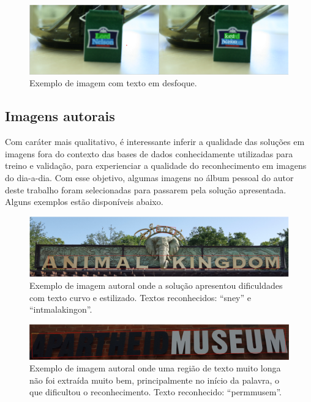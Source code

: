 \begin{figure}
    \centering
    \includegraphics[width=\textwidth]{figs/resultados-icdar13-04.png}
    \caption{Exemplo de imagem com texto em desfoque.}
    \label{fig:results_icdar13_04}
\end{figure}


\subsection{Imagens autorais}\label{sec:results_own_images}
Com caráter mais qualitativo, é interessante inferir a qualidade das soluções em imagens fora do contexto das bases de dados 
conhecidamente utilizadas para treino e validação, para experienciar a qualidade do reconhecimento em imagens do dia-a-dia. 
Com esse objetivo, algumas imagens no álbum pessoal do autor deste trabalho foram selecionadas para passarem pela solução 
apresentada. Alguns exemplos estão disponíveis abaixo.

\begin{figure}
    \centering
    \includegraphics[width=\textwidth]{figs/resultados-autoral-01.png}
    \caption{Exemplo de imagem autoral onde a solução apresentou dificuldades com texto curvo e estilizado. Textos reconhecidos: “sney” e “intmalakingon”.}
    \label{fig:results_own_images_01}
\end{figure}

\begin{figure}
    \centering
    \includegraphics[width=\textwidth]{figs/resultados-autoral-02.png}
    \caption{Exemplo de imagem autoral onde uma região de texto muito longa não foi extraída muito bem, principalmente no início 
    da palavra, o que dificultou o reconhecimento. Texto reconhecido: “permmusem”.}
    \label{fig:results_own_images_02}
\end{figure}

